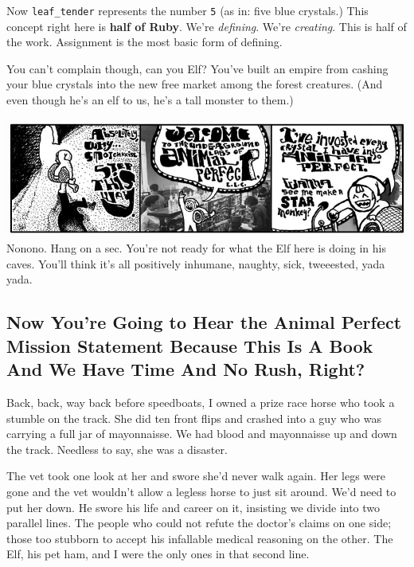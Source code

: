 \documentclass[10pt,twoside]{report}
\begin{document}
Now \lstinline[breaklines=true]|leaf_tender| represents the number
\lstinline[breaklines=true]|5| (as in: five blue crystals.)  This
concept right here is {\bf half of Ruby}.  We're {\em defining}.
We're {\em creating}.  This is half of the work.  Assignment is the
most basic form of defining.

You can't complain though, can you Elf?  You've built an empire from
cashing your blue crystals into the new free market among the forest
creatures.  (And even though he's an elf to us, he's a tall monster to
them.)

	\includegraphics[width=1.0\textwidth]{cache/23.png} Nonono.
        Hang on a sec.  You're not ready for what the Elf here is
        doing in his caves. You'll think it's all positively inhumane,
        naughty, sick, tweeested, yada yada.



\subsection{ Now You're Going to Hear the Animal Perfect Mission
  Statement Because This Is A Book And We Have Time And No Rush,
  Right?}



Back, back, way back before speedboats, I owned a prize race horse who
took a stumble on the track.  She did ten front flips and crashed into
a guy who was carrying a full jar of mayonnaisse.  We had blood and
mayonnaisse up and down the track.  Needless to say, she was a
disaster.

The vet took one look at her and swore she'd never walk again.  Her
legs were gone and the vet wouldn't allow a legless horse to just sit
around.  We'd need to put her down.  He swore his life and career on
it, insisting we divide into two parallel lines.  The people who could
not refute the doctor's claims on one side; those too stubborn to
accept his infallable medical reasoning on the other.  The Elf, his
pet ham, and I were the only ones in that second line.
\end{document}
